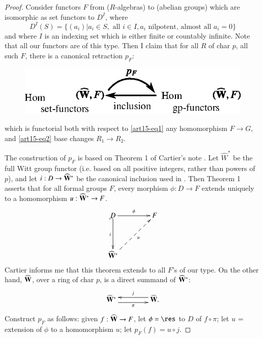 \begin{proof}
Consider functors $F$ from ($R$-algebras) to (abelian groups) which are isomorphic as set functors to $D^{I}$, where
$$
D^{I}(S)=\{(a_{i})|a_{i}\in S,\text{ all } i\in I, a_{i}\text{ nilpotent, almost all } a_{i}=0\}
$$
and where $I$ is an indexing set which is either finite or countably infinite. Note that all our functors are of this type. Then I claim that for all $R$ of char $p$, all such $F$, there is a canonical retraction $p_{F}$:
\begin{figure}[H]
\centering
\includegraphics{figures/fig3.eps}
\end{figure}\pageoriginale
which is functorial both with respect to \eqref{art15-eq1} any homomorphism $F\to G$, and \eqref{art15-eq2} base changes $R_{1}\to R_{2}$.

The construction of $p_{F}$ is based on Theorem 1 of Cartier's note \cite{art15-key1}. Let $\widehat{W}^{*}$ be the full Witt group functor (i.e. based on all positive integers, rather than powers of $p$), and let $i:D\to \widehat{\mathbf{W}}^{*}$ be the canonical inclusion used in \cite{art15-key1}. Then Theorem 1 asserts that for all formal groups $F$, every morphism $\phi:D\to F$ extends uniquely to a homomorphism $u:\widehat{\mathbf{W}}^{*}\to F$.
\[
\xymatrix@=1.5cm{
D\ar[r]^-{\phi}\ar@{_(->}[d]_-{i} & F\\
\widehat{\bfW}^{*}\ar@{-->}[ur]_-{u}
}
\]
Cartier informs me that this theorem extends to all $F$'s of our type. On the other hand, $\widehat{\mathbf{W}}$, over a ring of char $p$, is a direct summand of $\widehat{\mathbf{W}}^{*}$:
\[
\xymatrix@C=1.5cm{
\widehat{\bfW}^{*}\ar@<-.3pc>[r]_-{\pi} & \widehat{\bfW}\ar@<-.3pc>[l]_{j}.
}
\]
Construct $p_{F}$ as follows: given $f:\widehat{\mathbf{W}}\to F$, let $\phi=\res$ to $D$ of $f\circ \pi$; let $u$ = extension of $\phi$ to a homomorphism $u$; let $p_{F}(f)=u\circ j$.


\end{proof}
